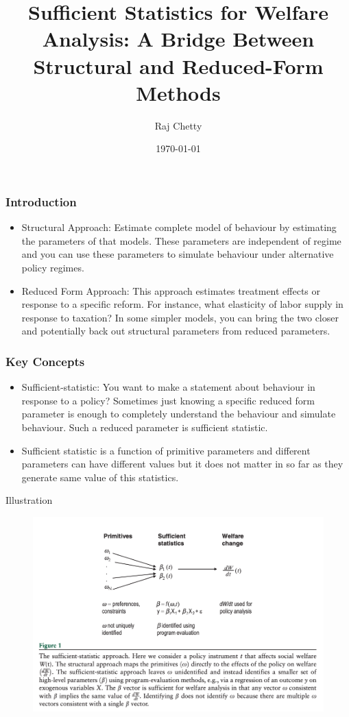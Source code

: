 \documentclass{beamer}
\title{Sufficient Statistics for Welfare Analysis: A Bridge Between Structural and Reduced-Form Methods}
\author{Raj Chetty}
\date{\today}
\begin{document}
\frame{\titlepage}

\begin{frame}
\frametitle{Introduction}
\begin{itemize}
\item Structural Approach: Estimate complete model of behaviour by estimating the parameters of that models. These parameters are independent of regime and you can use these parameters to simulate behaviour under alternative policy regimes. 
\item Reduced Form Approach: This approach estimates treatment effects or response to a specific reform. For instance, what elasticity of labor supply in response to taxation? In some simpler models, you can bring the two closer and potentially back out structural parameters from reduced parameters. 

\end{itemize}
\end{frame}

\begin{frame}
\frametitle{Key Concepts}
\begin{itemize}
    \item Sufficient-statistic: You want to make a statement about behaviour in response to a policy? Sometimes just knowing a specific reduced form parameter is enough to completely understand the behaviour and simulate behaviour. Such a reduced parameter is sufficient statistic. 
    \item Sufficient statistic is a function of primitive parameters and different parameters can have different values but it does not matter in so far as they generate same value of this statistics.
\end{itemize}
\end{frame}

\begin{frame}{Illustration}
    \begin{figure}[h]
        \centering
        \includegraphics[width =\textwidth]{Paper Presentations/SufficientStatIlustration.png}
        \label{fig:enter-label}
    \end{figure}
\end{frame}
\end{document}
